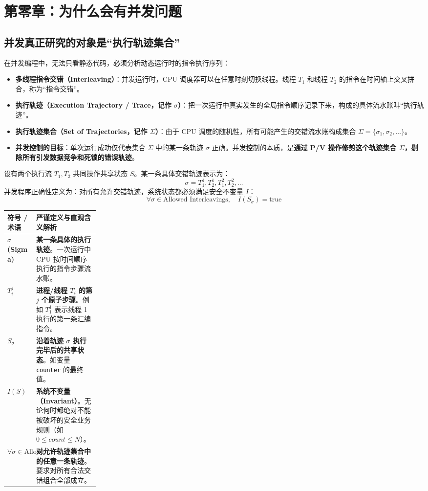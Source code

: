 \documentclass[11pt,a4paper]{ctexart}
\newcommand{\kw}[1]{\textbf{#1}}
\newcommand{\code}[1]{\texttt{#1}}
\begin{document}
\tableofcontents
\newpage

\section{第零章：为什么会有并发问题}

\subsection{并发真正研究的对象是“执行轨迹集合”}

在并发编程中，无法只看静态代码，必须分析动态运行时的指令执行序列：
\begin{itemize}[leftmargin=1.5em]
\item \kw{多线程指令交错（Interleaving）}：并发运行时，CPU 调度器可以在任意时刻切换线程。线程 $T_1$ 和线程 $T_2$ 的指令在时间轴上交叉拼合，称为“指令交错”。
\item \kw{执行轨迹（Execution Trajectory / Trace，记作 $\sigma$）}：把一次运行中真实发生的全局指令顺序记录下来，构成的具体流水账叫“执行轨迹”。
\item \kw{执行轨迹集合（Set of Trajectories，记作 $\Sigma$）}：由于 CPU 调度的随机性，所有可能产生的交错流水账构成集合 $\Sigma = \{\sigma_1, \sigma_2, \ldots\}$。
\item \kw{并发控制的目标}：单次运行成功仅代表集合 $\Sigma$ 中的某一条轨迹 $\sigma$ 正确。并发控制的本质，是\kw{通过 P/V 操作修剪这个轨迹集合 $\Sigma$，剔除所有引发数据竞争和死锁的错误轨迹}。
\end{itemize}

设有两个执行流 $T_1,T_2$ 共同操作共享状态 $S$。某一条具体交错轨迹表示为：
\[
\sigma=T_1^1,T_2^1,T_1^2,T_2^2,\ldots
\]
并发程序正确性定义为：对所有允许交错轨迹，系统状态都必须满足安全不变量 $I$：
\[
\boxed{\forall\sigma\in\text{Allowed Interleavings},\quad I(S_\sigma)=\mathrm{true}}
\]

\begingroup
\small
\renewcommand{\arraystretch}{1.25}
\begin{tabularx}{\linewidth}{>{\bfseries}p{0.22\linewidth} X}
\toprule
符号 / 术语 & 严谨定义与直观含义解析 \\
\midrule
$\sigma$ (Sigma) & \kw{某一条具体的执行轨迹}。一次运行中 CPU 按时间顺序执行的指令步骤流水账。 \\
$T_i^j$ & \kw{进程/线程 $T_i$ 的第 $j$ 个原子步骤}。例如 $T_1^1$ 表示线程 1 执行的第一条汇编指令。 \\
$S_\sigma$ & \kw{沿着轨迹 $\sigma$ 执行完毕后的共享状态}。如变量 \code{counter} 的最终值。 \\
$I(S)$ & \kw{系统不变量（Invariant）}。无论何时都绝对不能被破坏的安全业务规则（如 $0 \le count \le N$）。 \\
$\forall\sigma \in \text{Allowed Interleavings}$ & \kw{对允许轨迹集合中的任意一条轨迹}。要求对所有合法交错组合全部成立。 \\
\bottomrule
\end{tabularx}
\endgroup
\end{document}
